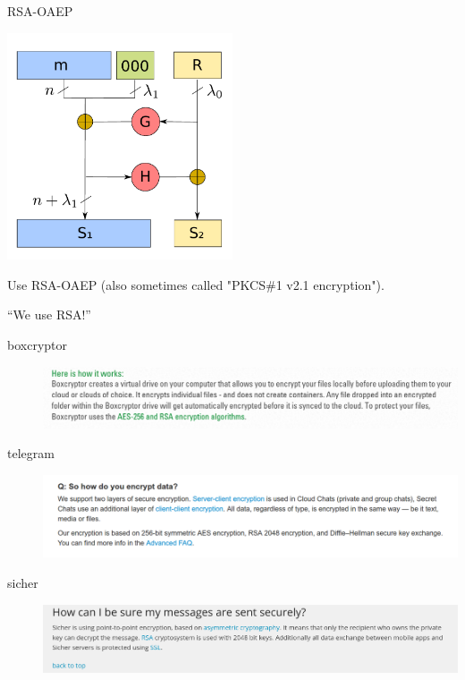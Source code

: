 \documentclass[presentation,smaller]{beamer}
\begin{document}
\begin{frame}[label={sec:orgheadline7}]{RSA-OAEP}
\begin{center}
\includegraphics[width=0.5\textwidth]{./rsa-oaep.pdf}
\end{center}

Use RSA-OAEP (also sometimes called "PKCS\#1 v2.1 encryption").
\end{frame}

\begin{frame}[label={sec:orgheadline8}]{“We use RSA!”}
\begin{description}
\item[{boxcryptor}] \includegraphics[width=.9\linewidth]{./boxcryptor.png}
\item[{telegram}] \includegraphics[width=.9\linewidth]{./telegram.png}
\item[{sicher}] \includegraphics[width=.9\linewidth]{./sicher.png}
\end{description}
\end{frame}
\end{document}
